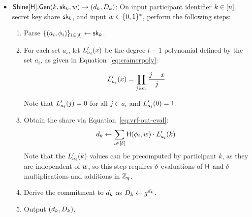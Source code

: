 \begin{itemize}
  \item $\mathsf{Shine}[\mathsf{H}].\mathsf{Gen}(k, \mathsf{sk}_k, w) \rightarrow (d_k, D_k)$:
    On input participant identifier $k \in [n]$,
    secret key share $\mathsf{sk}_k$,
    and input $w \in \{0,1\}^*$,
    perform the following steps:
    \begin{enumerate}
      \item Parse $\{ (a_i, \phi_i) \}_{i \in [\delta]} \gets \mathsf{sk}_k$.
      \item For each set $a_i$,
        let $L'_{a_i}(x)$ be the degree $t-1$ polynomial defined by the set $a_i$,
        as given in Equation~\ref{eq:cramerpoly}:

        \begin{equation} \label{eq:cramerpoly}
          L'_{a_i}(x) = \prod_{j \in a_i}\frac{j - x}{j}
        \end{equation}

        Note that $L'_{a_i}(j) = 0$ for all $j \in a_i$ and $L'_{a_i}(0) = 1$.

      \item Obtain the share via Equation~\ref{eq:vrf-out-eval}:
    \begin{equation} \label{eq:vrf-out-eval}
      d_k \gets \sum_{i \in [\delta]} \mathsf{H}(\phi_i, w) \cdot L'_{a_i}(k)
    \end{equation}
    Note that the $L'_{a_i}(k)$ values can be precomputed by participant $k$, as they are independent of $w$, so this step requires $\delta$ evaluations of $\mathsf{H}$ and $\delta$ multiplications and additions in $\mathbb{Z}_q$.

      \item Derive the commitment to $d_k$ as $D_k \gets g^{d_k}$.
      \item Output $(d_k, D_k)$.
    \end{enumerate}


\end{itemize}
